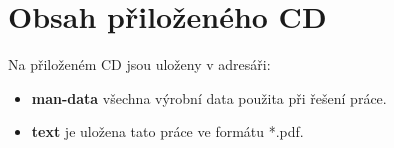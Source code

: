 
\chapter{Obsah přiloženého CD}
Na přiloženém CD jsou uloženy v adresáři:
\begin{itemize}
\item \textbf{man-data} všechna výrobní data použita při řešení práce.
\item \textbf{text} je uložena tato práce ve formátu *.pdf.
\end{itemize} 
